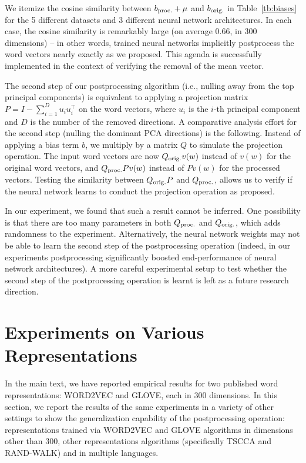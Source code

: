\documentclass{article} \usepackage{acl2017,times}
\begin{document}
{We itemize the cosine similarity between  $b_{\rm proc.} + \mu$ and  $b_{\rm orig.}$ in Table~\ref{tb:biases} for the 5 different datasets and 3 different neural network architectures. In each case,  the cosine similarity is remarkably large (on average 0.66, in 300 dimensions) -- in other words, trained neural networks   implicitly postprocess the word vectors nearly exactly as we proposed.
This  agenda is successfully implemented  in the  context of verifying the  removal of the mean vector.  

The second step of our postprocessing algorithm (i.e., nulling away from the top principal components) is equivalent to applying a projection matrix $P = I - \sum_{i=1}^D u_iu_i^{\top}$ on  the word vectors, where $u_i$ is the $i$-th principal component and $D$ is the number of the removed directions. 
 A comparative analysis effort for the second step  (nulling the dominant PCA directions) is the following. Instead of applying a bias term $b$, we multiply by a matrix $Q$ to simulate the projection operation. The input word vectors are now $Q_{\rm orig.}v(w)$ instead of $v(w)$ for the original word vectors, and $Q_{\rm proc.}Pv(w)$ instead of $Pv(w)$ for the processed vectors. Testing the similarity between $Q_{\rm orig.}P$ and $Q_{\rm proc.}$, allows us to verify if the neural network learns to conduct the projection operation as proposed. 
 
 In our experiment, we found that such a  result cannot be inferred. One possibility is that there are too many parameters in both $Q_{\rm proc.}$ and $Q_{\rm orig.}$, which adds  randomness to the experiment. Alternatively, the neural network weights may not be able to learn the second step of the postprocessing operation (indeed, in our experiments postprocessing significantly boosted end-performance of neural network architectures).  A more careful experimental setup  to test whether the second step of the postprocessing operation  is learnt is left  as a future research direction. 
 }
 
 \section{Experiments on Various Representations}
\label{app:extra}
In the main text, we have reported empirical results for two published word representations:    WORD2VEC and GLOVE, each in 300 dimensions. In this section, we report the results of the same  experiments in a variety of other settings to show the generalization capability of the postprocessing operation: representations trained via WORD2VEC and GLOVE algorithms in  dimensions other than 300, other representations algorithms (specifically TSCCA and RAND-WALK) and in  multiple languages.
\end{document}
